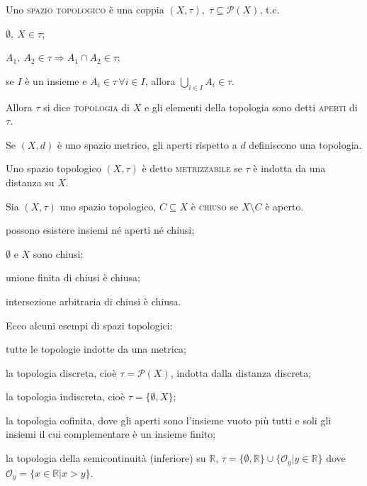\begin{defn}
    Uno \textsc{spazio topologico} è una coppia $(X, \tau),\; {\tau \subseteq
    \mathcal{P}(X)}$, t.c.
    \begin{nlist}
        \item $\emptyset,\ X \in \tau$;
        \item $A_1,\ A_2 \in \tau \Rightarrow A_1 \cap A_2 \in \tau$;
        \item se $I$ è un insieme e $A_i \in \tau \, \forall i \in I$, allora
        $\displaystyle \bigcup_{i \in I} A_i \in \tau$.
    \end{nlist}
    Allora $\tau$ si dice \textsc{topologia} di $X$ e gli elementi della
    topologia sono detti \textsc{aperti} di $\tau$.
\end{defn}

\begin{prop}
    Se $(X, d)$ è uno spazio metrico, gli aperti rispetto a $d$ definiscono una
    topologia.
\end{prop}

\begin{defn}
    Uno spazio topologico $(X, \tau)$ è detto \textsc{metrizzabile} se $\tau$ è
    indotta da una distanza su $X$.
\end{defn}

\begin{defn}
    Sia $(X, \tau)$ uno spazio topologico, $C \subseteq X$ è \textsc{chiuso} se
    $X \setminus C$ è aperto.
\end{defn}

\begin{oss}
\begin{nlist}
\item possono esistere insiemi né aperti né chiusi;
\item $\emptyset$ e $X$ sono chiusi;
\item unione finita di chiusi è chiusa;
\item intersezione arbitraria di chiusi è chiusa.
\end{nlist}
\end{oss}

\begin{ex}
    Ecco alcuni esempi di spazi topologici:
    \begin{nlist}
        \item tutte le topologie indotte da una metrica;
        \item la topologia discreta, cioè $\tau=\mathcal{P}(X)$, indotta dalla
        distanza discreta;
        \item la topologia indiscreta, cioè $\tau=\{ \emptyset, X \}$;
        \item la topologia cofinita, dove gli aperti sono l'insieme vuoto più
        tutti e soli gli insiemi il cui complementare è un insieme finito;
        \item la topologia della semicontinuità (inferiore) su $\mathbb{R}$, $\tau=\{\emptyset, \mathbb{R}\} \cup \{\mathcal{O}_y | y \in \mathbb{R}\}$ dove $\mathcal{O}_y=\{x \in \mathbb{R} | x>y\}$.
    \end{nlist}
\end{ex}

